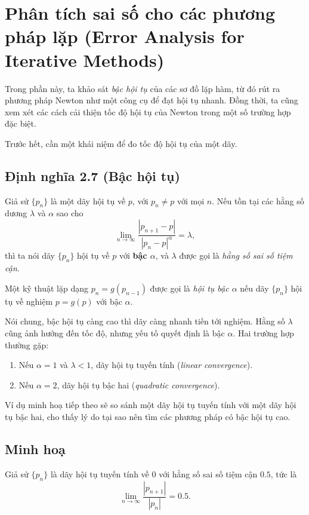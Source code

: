 \section{Phân tích sai số cho các phương pháp lặp (Error Analysis for Iterative Methods)}

Trong phần này, ta khảo sát \textit{bậc hội tụ} của các sơ đồ lặp hàm, 
từ đó rút ra phương pháp Newton như một công cụ để đạt hội tụ nhanh. 
Đồng thời, ta cũng xem xét các cách cải thiện tốc độ hội tụ của Newton trong một số trường hợp đặc biệt.

Trước hết, cần một khái niệm để đo tốc độ hội tụ của một dãy.

\subsection*{Định nghĩa 2.7 (Bậc hội tụ)}

Giả sử $\{p_n\}$ là một dãy hội tụ về $p$, với $p_n \neq p$ với mọi $n$. 
Nếu tồn tại các hằng số dương $\lambda$ và $\alpha$ sao cho
\[
\lim_{n \to \infty} \frac{|p_{n+1} - p|}{|p_n - p|^\alpha} = \lambda,
\]
thì ta nói dãy $\{p_n\}$ hội tụ về $p$ với \textbf{bậc $\alpha$}, 
và $\lambda$ được gọi là \textit{hằng số sai số tiệm cận}.

Một kỹ thuật lặp dạng $p_n = g(p_{n-1})$ được gọi là \textit{hội tụ bậc $\alpha$} 
nếu dãy $\{p_n\}$ hội tụ về nghiệm $p = g(p)$ với bậc $\alpha$.

Nói chung, bậc hội tụ càng cao thì dãy càng nhanh tiến tới nghiệm. 
Hằng số $\lambda$ cũng ảnh hưởng đến tốc độ, nhưng yếu tố quyết định là bậc $\alpha$. 
Hai trường hợp thường gặp:
\begin{enumerate}
  \item Nếu $\alpha = 1$ và $\lambda < 1$, dãy hội tụ tuyến tính (\textit{linear convergence}).
  \item Nếu $\alpha = 2$, dãy hội tụ bậc hai (\textit{quadratic convergence}).
\end{enumerate}

Ví dụ minh hoạ tiếp theo sẽ so sánh một dãy hội tụ tuyến tính với một dãy hội tụ bậc hai, 
cho thấy lý do tại sao nên tìm các phương pháp có bậc hội tụ cao.

\subsection*{\textbf{Minh hoạ}}

Giả sử $\{p_n\}$ là dãy hội tụ tuyến tính về $0$ với hằng số sai số tiệm cận $0.5$, tức là
\[
\lim_{n \to \infty} \frac{|p_{n+1}|}{|p_n|} = 0.5.
\]

